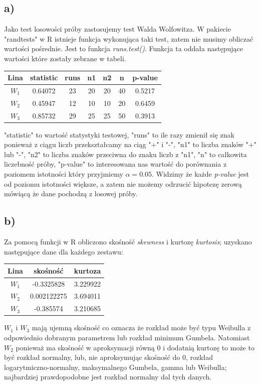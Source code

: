 \documentclass{article}
\begin{document}
\subsection{a)}
Jako test losowości próby zastosujemy test Walda Wolfowitza. W pakiecie "randtests" w R istnieje funkcja wykonująca taki test, zatem nie musimy obliczać wartości pośrednie. Jest to funkcja \textit{runs.test()}. Funkcja ta oddała następujące wartości które zostały zebrane w tabeli.
\begin{center} \begin{tabular}{|c|c|c|c|c|c|c|} \hline
Lina & statistic & runs & n1 & n2 & n & p-value \\ \hline
$W_1$ & 0.64072 & 23 & 20 & 20 & 40 & 0.5217 \\ \hline
$W_2$ & 0.45947 & 12 & 10 & 10 & 20 & 0.6459 \\ \hline
$W_3$ & 0.85732 & 29 & 25 & 25 & 50 & 0.3913 \\ \hline
\end{tabular} \end{center}
"statistic" to wartość statystyki testowej, "runs" to ile razy zmienił się znak ponieważ z ciągu liczb przekształcamy na ciąg "+" i "-", "n1" to liczba znaków "+" lub "-", "n2" to liczba znaków przeciwna do znaku liczb z "n1", "n" to całkowita liczebność próby, "p-value" to interesowana nas wartość do porównania z poziomem istotności który przyjmiemy $\alpha = 0.05$. Widzimy że każde \textit{p-value} jest od poziomu istotności większe, a zatem nie możemy odrzucić hipotezę zerową mówiącą że dane pochodzą z losowej próby.

\subsection{b)}
Za pomocą funkcji w R obliczono skośność \textit{skewness} i kurtozę \textit{kurtosis}; uzyskano następujące dane dla każdego zestawu:
\begin{center} \begin{tabular}{|c|c|c|} \hline
Lina & skośność & kurtoza \\ \hline
$W_1$ & -0.3325828 & 3.229922 \\ \hline
$W_2$ & 0.002122275 & 3.694011 \\ \hline
$W_3$ & -0.385574 & 3.210685 \\ \hline
\end{tabular} \end{center}

$W_1$ i $W_3$ mają ujemną skośność co oznacza że rozkład może być typu Weibulla z odpowiednio dobranym parametrem lub rozkład minimum Gumbela. Natomiast $W_2$ ponieważ ma skośność w aproksymacji równą 0 i dodatnią kurtozę to może to być rozkład normalny, lub, nie aproksymując skośność do 0, rozkład logarytmiczno-normalny, maksymalnego Gumbela, gamma lub Weibulla; najbardziej prawdopodobne jest rozkład normalny dal tych danych.
\end{document}
